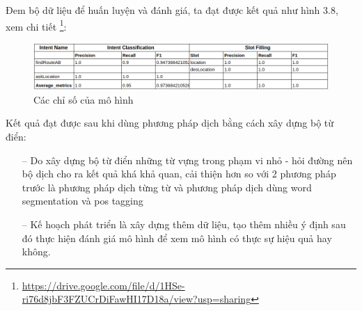 \begin{enumerate}
\begin{figure}[htp]
          \end{figure}
          
          Đem bộ dữ liệu để huấn luyện và đánh giá, ta đạt được kết quả như hình 3.8, xem chi tiết \footnote{\url{https://drive.google.com/file/d/1HSe-ri76d8jbF3FZUCrDiFawHI17D18a/view?usp=sharing}}:
          
          \begin{figure}[htp]
              \centering
              \includegraphics[width=15cm]{images/metrics-tudien.png}
              \caption{Các chỉ số của mô hình}
              \label{fig:sodohethongchiduong}
          \end{figure}
          Kết quả đạt được sau khi dùng phương pháp dịch bằng cách xây dựng bộ từ điển:
          \begin{itemize}
              \item[--] Do xây dựng bộ từ điển những từ vựng trong phạm vi nhỏ - hỏi đường nên bộ dịch cho ra kết quả khá khả quan, cải thiện hơn so với 2 phương pháp trước là phương pháp dịch từng từ và phương pháp dịch dùng word segmentation và pos tagging
              \item[--] Kế hoạch phát triển là xây dựng thêm dữ liệu, tạo thêm nhiều ý định sau đó thực hiện đánh giá mô hình để xem mô hình có thực sự hiệu quả hay không.
          \end{itemize}
\end{enumerate}